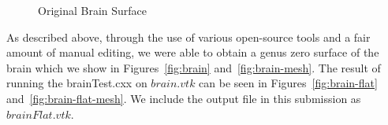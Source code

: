 \documentclass{InsightArticle}
\begin{document}
  \begin{figure}[t]
		\begin{center}
    \end{center}
    \vspace{-.25in} \caption{Original Brain Surface}
  \end{figure}  

  As described above, through the use of various open-source tools and
  a fair amount of manual editing, we were able to obtain a genus zero
  surface of the brain which we show in Figures~\ref{fig:brain}
  and~\ref{fig:brain-mesh}. The result of running the brainTest.cxx on
  $brain.vtk$ can be seen in Figures~\ref{fig:brain-flat}
  and~\ref{fig:brain-flat-mesh}. We include the output file in this
  submission as $brainFlat.vtk$.
\end{document}
